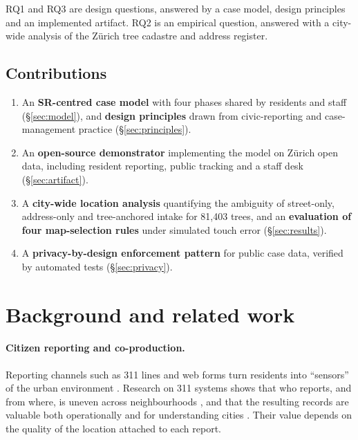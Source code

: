 \documentclass[11pt,a4paper]{article}
\begin{document}
RQ1 and RQ3 are design questions, answered by a case model, design principles and an implemented artifact. RQ2 is an empirical question, answered with a city-wide analysis of the Zürich tree cadastre and address register.

\subsection{Contributions}

\begin{enumerate}
  \item An \textbf{SR-centred case model} with four phases shared by residents and staff (\S\ref{sec:model}), and \textbf{design principles} drawn from civic-reporting and case-management practice (\S\ref{sec:principles}).
  \item An \textbf{open-source demonstrator} implementing the model on Zürich open data, including resident reporting, public tracking and a staff desk (\S\ref{sec:artifact}).
  \item A \textbf{city-wide location analysis} quantifying the ambiguity of street-only, address-only and tree-anchored intake for 81{,}403 trees, and an \textbf{evaluation of four map-selection rules} under simulated touch error (\S\ref{sec:results}).
  \item A \textbf{privacy-by-design enforcement pattern} for public case data, verified by automated tests (\S\ref{sec:privacy}).
\end{enumerate}

\section{Background and related work}
\label{sec:background}

\paragraph{Citizen reporting and co-production.}
Reporting channels such as 311 lines and web forms turn residents into ``sensors'' of the urban environment \cite{goodchild2007}. Research on 311 systems shows that who reports, and from where, is uneven across neighbourhoods \cite{minkoff2016,clark2013}, and that the resulting records are valuable both operationally and for understanding cities \cite{obrien2018}. Their value depends on the quality of the location attached to each report.
\end{document}
